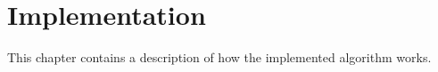 \chapter{Implementation}
\label{Chapter::Implementation}

This chapter contains a description of how the implemented algorithm works.

